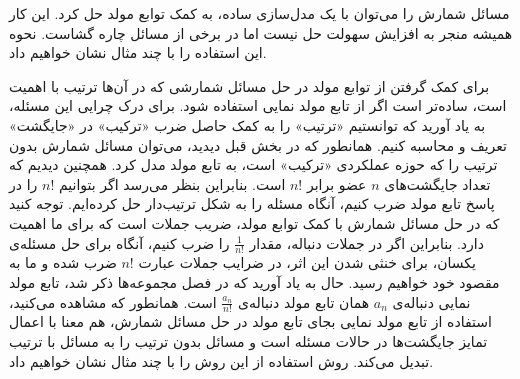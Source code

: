 \p
مسائل شمارش را می‌توان با یک مدل‌سازی ساده، به کمک توابع مولد حل کرد.
این کار همیشه منجر به افزایش سهولت حل نیست اما در برخی از مسائل چاره گشاست.
نحوه این استفاده را با چند مثال نشان خواهیم داد.






\p
برای کمک گرفتن از توابع مولد در حل مسائل شمارشی که در آن‌ها ترتیب با اهمیت است،
ساده‌تر است اگر از تابع مولد نمایی استفاده شود.
\p
برای درک چرایی این مسئله، به یاد آورید که توانستیم
«ترتیب»
را به کمک حاصل ضرب
«ترکیب»
در
«جایگشت»
تعریف و محاسبه کنیم.
همانطور که در بخش قبل دیدید، می‌توان مسائل شمارش بدون ترتیب
را که حوزه عملکردی
«ترکیب»
است، به تابع مولد مدل کرد.
همچنین دیدیم که
تعداد جایگشت‌های
$n$ عضو
برابر $n!$
است.
بنابراین بنظر می‌رسد اگر بتوانیم
$n!$
را در پاسخ تابع مولد ضرب کنیم، آنگاه مسئله را به شکل ترتیب‌دار حل کرده‌ایم.
توجه کنید که در حل مسائل شمارش با کمک توابع مولد، ضریب جملات است که برای ما اهمیت دارد. بنابراین اگر در جملات
دنباله‌، مقدار
$\frac{1}{n!}$
را ضرب کنیم، آنگاه برای حل مسئله‌ی یکسان، برای خنثی شدن این اثر، در ضرایب جملات عبارت
$n!$
ضرب شده و ما به مقصود خود خواهیم رسید.
حال به یاد آورید که در فصل مجموعه‌ها ذکر شد، تابع مولد نمایی دنباله‌ی
$a_n$
همان تابع مولد دنباله‌ی
$\frac{a_n}{n!}$
است.
\p
همانطور که مشاهده می‌کنید، استفاده از تابع مولد نمایی بجای تابع مولد در حل مسائل شمارش، هم معنا با اعمال تمایز
جایگشت‌ها در حالات مسئله است و مسائل بدون ترتیب را به مسائل با ترتیب تبدیل می‌کند.
\p
روش استفاده از این روش را با چند مثال نشان خواهیم داد.




